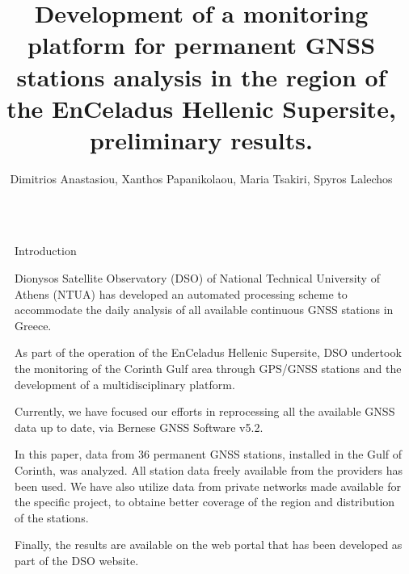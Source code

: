 \documentclass[final,a0,portrait]{beamer}
\title{Development of a monitoring platform for permanent GNSS stations analysis in the region of the EnCeladus Hellenic Supersite, preliminary results.} %
\author{Dimitrios Anastasiou, Xanthos Papanikolaou, Maria Tsakiri, Spyros Lalechos}%
\institute{Dionysos Satellite Obseratory, School of Rural Surveying and Geomatics Engineering, NTUA\\ \vspace{0.3em} \par{Earthquake Planning and Protection Organization}} %
\newlength{\sepwid}
\newlength{\onecolwid}
\begin{document}

\setlength{\belowcaptionskip}{2ex} %
\setlength\belowdisplayshortskip{2ex} %

\begin{frame}[t] %

\begin{columns}[t] %

\begin{column}{\sepwid}\end{column} %

\begin{column}{\onecolwid} %


\begin{block}{Introduction}
{\small
Dionysos Satellite Observatory (DSO) of National Technical University of Athens (NTUA)
has developed an automated processing scheme to accommodate the daily analysis of all available continuous GNSS stations in Greece.

As part of the operation of the EnCeladus Hellenic Supersite, DSO undertook the monitoring of the Corinth Gulf area through GPS/GNSS stations and the development of a multidisciplinary platform.

Currently, we have focused our efforts in reprocessing all the available GNSS data up to date, via Bernese GNSS Software v5.2\cite{bernese}.

In this paper, data from 36 permanent GNSS stations, installed in the Gulf of Corinth, was analyzed. All station data freely available from the providers has been used. We have also utilize data from private networks made available for the specific project, to obtaine better coverage of the region and distribution of the stations. 

Finally, the results are available on the web portal that has been developed as part of the DSO website. 

}
\end{block}
\end{column}
\end{columns}
\end{frame}
\end{document}
